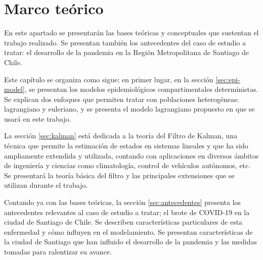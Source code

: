 \chapter{Marco teórico}\label{chap:marco}



En este apartado se presentarán las bases teóricas y conceptuales que sustentan el trabajo realizado. Se presentan también los antecedentes del caso de estudio a tratar: el desarrollo de la pandemia en la Región Metropolitana de Santiago de Chile.

Este capítulo se organiza como sigue; en primer lugar, en la sección \ref{sec:epi-model}, se presentan los modelos epidemiológicos compartimentales deterministas. Se explican dos enfoques que permiten tratar con poblaciones heterogéneas: lagrangiano y euleriano, y se presenta el modelo lagrangiano propuesto en \cite{Bichara2018} que se usará en este trabajo.


La sección \ref{sec:kalman} está dedicada a la teoría del Filtro de Kalman, una técnica que permite la estimación de estados en sistemas lineales y que ha sido ampliamente extendida y utilizada, contando con aplicaciones en diversos ámbitos de ingeniería y ciencias como climatología, control de vehículos autónomos, etc. Se presentará la teoría básica del filtro y las principales extensiones que se utilizan durante el trabajo.

Contando ya con las bases teóricas, la sección \ref{sec:antecedentes} presenta los antecedentes relevantes al caso de estudio a tratar; el brote de COVID-19 en la ciudad de Santiago de Chile. Se describen características particulares de esta enfermedad y cómo influyen en el modelamiento. Se presentan características de la ciudad de Santiago que han influido el desarrollo de la pandemia y las medidas tomadas para ralentizar su avance.


